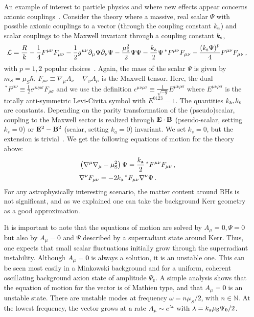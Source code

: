 \documentclass[11pt]{article}
\def\beq{\begin{eqnarray}}
\def\eeq{\end{eqnarray}}
\numberwithin{equation}{section} %
\begin{document}
An example of interest to particle physics and where new effects appear concerns axionic couplings~\cite{Anastassopoulos:2017ftl}. Consider the theory 
where a massive, real scalar $\Psi$ with possible axionic couplings to a vector (through the coupling constant 
$k_{\rm a}$) and scalar couplings to the Maxwell invariant through a coupling constant $k_{\rm s}$,
%
\beq
\label{eq:MFaction2}
{\cal L}=\frac{R}{k}- \frac{1}{4} F^{\mu\nu} F_{\mu\nu} - \frac{1}{2} g^{\mu\nu} \partial_{\mu}\Psi\partial_{\nu} 
\Psi-\frac{\mu^{2}_{\rm S}}{2} \Psi\Psi - \frac{k_{\rm a}}{2} \Psi \,^{\ast}F^{\mu\nu} F_{\mu\nu}-\frac{\left(k_{\rm 
s}\Psi\right)^p}{4} F^{\mu\nu} F_{\mu\nu} \,,
\eeq
%
with $p=1,2$ popular choices~\cite{Stadnik:2015kpa,Olive:2007aj}. Again, the mass of the scalar $\Psi$ is given by $m_S = \mu_S \hbar$, 
$F_{\mu\nu} \equiv
\nabla_{\mu}A_{\nu} - \nabla_{\nu} A_{\mu}$ is the Maxwell tensor. Here, the dual $\,^{\ast}F^{\mu\nu} \equiv 
\frac{1}{2}\epsilon^{\mu\nu\rho\sigma}F_{\rho\sigma}$ and we use the definition $\epsilon^{\mu\nu\rho\sigma}\equiv
\frac{1}{\sqrt{-g}}E^{\mu\nu\rho\sigma}$ where $E^{\mu\nu\rho\sigma}$ is
the totally anti-symmetric Levi-Civita symbol with $E^{0123}=1$.
The quantities $k_{\rm a}, k_{\rm s}$ are constants.
%
Depending on the parity transformation of the 
(pseudo)scalar, coupling to the Maxwell sector is realized through ${\bf E}\cdot {\bf B}$ (pseudo-scalar, setting 
$k_s=0$) or ${\bf E}^2- 
{\bf B}^2$ (scalar, setting $k_a=0$) invariant. 
We set $k_s=0$, but the extension is trivial~\cite{Ikeda:2019fvj,Boskovic:2018lkj,Sen:2018cjt}.
%
We get the following equations of motion for the theory above:
%
\begin{subequations}
\label{eq:MFEoMgen2}
\begin{align}
\label{eq:MFEoMScalar2}
&\left(\nabla^{\mu}\nabla_{\mu} - \mu^{2}_{\rm S} \right) \Psi =\frac{k_{\rm a}}{2} \,^{\ast}F^{\mu\nu} F_{\mu\nu}\,,\\
%
\label{eq:MFEoMVector2}
&\nabla^{\nu} F_{\mu\nu} = - 2 k_{\rm a} \,^{\ast}F_{\mu\nu} \nabla^{\nu} \Psi\,.
%
\end{align}
\end{subequations}
%
For any astrophysically interesting scenario, the matter content around BHs is not significant, and as we explained
one can take the background Kerr geometry as a good approximation.

It is important to note that the equations of motion are solved by $A_\mu=0, \Psi=0$ but also by $A_\mu=0$ and $\Psi$
described by a superradiant state around Kerr. Thus, one expects that small scalar fluctuations initially grow through 
the superradiant instability. Although $A_\mu=0$ is always a solution, it is an unstable one. This can be seen most 
easily in a Minkowski background and for a uniform, coherent oscillating background axion state of amplitude $\Psi_0$. 
A 
simple analysis shows that the equation of motion for the vector is of Mathieu type, and that $A_\mu=0$ is an unstable 
state. There are unstable modes at frequency $\omega=n\mu_S/2$, with $n \in \mathbb{N}$. At the lowest 
frequency, the 
vector grows at a rate $A_\mu\sim e^{\lambda t}$ with $\lambda =k_a\mu_{\rm S}\Psi_0/2$.
\end{document}
